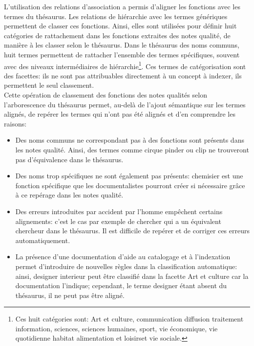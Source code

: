 L'utilisation des relations d'association a permis d'aligner les fonctions avec les termes du thésaurus. Les relations de hiérarchie avec les termes génériques permettent de classer ces fonctions. Ainsi, elles sont utilisées pour définir huit catégories de rattachement dans les fonctions extraites des notes qualité, de manière à les classer selon le thésaurus. Dans le thésaurus des noms communs, huit termes permettent de rattacher l'ensemble des termes spécifiques, souvent avec des niveaux intermédiaires de hiérarchie\footnote{Ces huit catégories sont: \og Art et culture\fg{}, \og communication diffusion traitement information\fg{}, \og sciences\fg{}, \og sciences humaines\fg{}, \og sport\fg{}, \og vie économique\fg{}, \og vie quotidienne habitat alimentation et loisirs\fg et \og vie sociale\fg{}.}. Ces termes de catégorisation sont des facettes: ils ne sont pas attribuables directement à un concept à indexer, ils permettent le seul classement.\\

Cette opération de classement des fonctions des notes qualités selon l'arborescence du thésaurus permet, au-delà de l'ajout sémantique sur les termes alignés, de repérer les termes qui n'ont pas été alignés et d'en comprendre les raisons:
\begin{itemize}
	\item Des noms communs ne correspondant pas à des fonctions sont présents dans les notes qualité. Ainsi, des termes comme \og cirque pinder\fg{} ou \og clip
	\fg{} ne trouveront pas d'équivalence dans le thésaurus.
	\item Des noms trop spécifiques ne sont également pas présents: \og chemisier\fg{} est une fonction spécifique que les documentalistes pourront créer si nécessaire grâce à ce repérage dans les notes qualité.
	\item Des erreurs introduites par accident par l'homme empêchent certains alignements: c'est le cas par exemple de \og chercher\fg{} qui a un équivalent \og chercheur\fg{} dans le thésaurus. Il est difficile de repérer et de corriger ces erreurs automatiquement.
	\item La présence d'une documentation d'aide au catalogage et à l'indexation permet d'introduire de nouvelles règles dans la classification automatique: ainsi, \og designer interieur\fg{} peut être classifié dans la facette \og Art et culture\fg{} car la documentation l'indique; cependant, le terme \og designer\fg{} étant absent du thésaurus, il ne peut pas être aligné.
\end{itemize}
